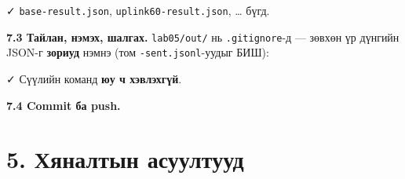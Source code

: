 ✓ \texttt{base-result.json}, \texttt{uplink60-result.\allowbreak{}json}, \ldots{} бүгд.

\textbf{7.3 Тайлан, нэмэх, шалгах.} \texttt{lab05/out/} нь \texttt{.gitignore}-д --- зөвхөн үр дүнгийн JSON-г \textbf{зориуд} нэмнэ (том \texttt{-sent.jsonl}-уудыг БИШ):

\begin{Shaded}
\begin{Highlighting}[]
\KeywordTok{|} 
\end{Highlighting}
\end{Shaded}

✓ Сүүлийн команд \textbf{юу ч хэвлэхгүй}.

\textbf{7.4 Commit ба push.}

\begin{Shaded}
\begin{Highlighting}[]
\KeywordTok{\&\&} 
\end{Highlighting}
\end{Shaded}

\hypertarget{ux445ux44fux43dux430ux43bux442ux44bux43d-ux430ux441ux443ux443ux43bux442ux443ux443ux434}{%
\section{5. Хяналтын асуултууд}\label{ux445ux44fux43dux430ux43bux442ux44bux43d-ux430ux441ux443ux443ux43bux442ux443ux443ux434}}


